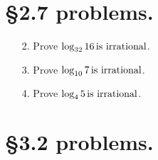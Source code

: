 \documentclass[a4paper, 12pt]{../../config/homework}
\begin{document}
\pagebreak
\section*{\S 2.7 problems.}
\begin{enumerate}
\item[2.] Prove $\log_{32}16\,\text{is irrational}$.

\item[3.] Prove $\log_{10}7\,\text{is irrational}$.

\item[4.] Prove $\log_4{5}\,\text{is irrational}$.
\end{enumerate}

\pagebreak
\section*{\S 3.2 problems.}
\end{document}
